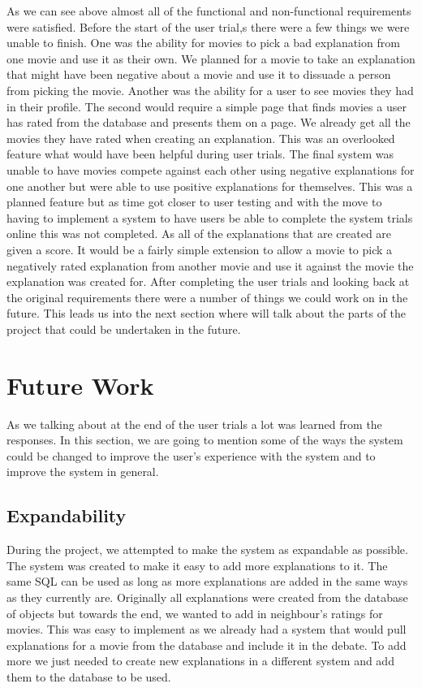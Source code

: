        As we can see above almost all of the functional and non-functional requirements were satisfied.
        Before the start of the user trial,s there were a few things we were unable to finish. One was the ability for movies to pick a bad explanation from one movie and use it as their own. We planned for a movie to take an explanation that might have been negative about a movie and use it to dissuade a person from picking the movie. Another was the ability for a user to see movies they had in their profile. The second would require a simple page that finds movies a user has rated from the database and presents them on a page. We already get all the movies they have rated when creating an explanation. This was an overlooked feature what would have been helpful during user trials. The final system was unable to have movies compete against each other using negative explanations for one another but were able to use positive explanations for themselves. This was a planned feature but as time got closer to user testing and with the move to having to implement a system to have users be able to complete the system trials online this was not completed. As all of the explanations that are created are given a score. It would be a fairly simple extension to allow a movie to pick a negatively rated explanation from another movie and use it against the movie the explanation was created for. After completing the user trials and looking back at the original requirements there were a number of things we could work on in the future. This leads us into the next section where will talk about the parts of the project that could be undertaken in the future.
        
         
    
    \section{Future Work}\label{sec:FutureWorks}
        As we talking about at the end of the user trials a lot was learned from the responses. In this section, we are going to mention some of the ways the system could be changed to improve the user's experience with the system and to improve the system in general. 
        

        \subsection{Expandability}
            During the project, we attempted to make the system as expandable as possible. The system was created to make it easy to add more explanations to it. The same SQL can be used as long as more explanations are added in the same ways as they currently are. Originally all explanations were created from the database of objects but towards the end, we wanted to add in neighbour's ratings for movies. This was easy to implement as we already had a system that would pull explanations for a movie from the database and include it in the debate. To add more we just needed to create new explanations in a different system and add them to the database to be used. 
            
